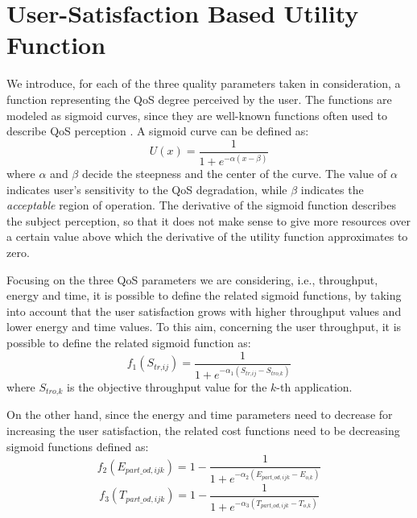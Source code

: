 \documentclass[twoside,openright]{report}
\begin{document}
\section{User-Satisfaction Based Utility Function} 
\label{sec:utility}
We introduce, for each of the three quality parameters taken in consideration, a function representing the \gls{QoS} degree perceived by the user. The functions are modeled as sigmoid curves, since they are well-known functions often used to describe \gls{QoS} perception \cite{Lohier,Badia,User-satisfaction}. A sigmoid curve can be defined as:
\begin{equation}
U(x)=\frac{1}{1+e^{-\alpha (x-\beta)}}
\label{eq:sigmoid}
\end{equation}
where $\alpha$ and $\beta$ decide the steepness and the center of the curve. The value of $\alpha$ indicates user's sensitivity to the  \gls{QoS} degradation, while $\beta$ indicates the \emph{acceptable} region of operation. The derivative of the sigmoid function describes the subject perception, so that it does not make sense to give more resources over a certain value above which the derivative of the utility function approximates to zero.

Focusing on the three \gls{QoS} parameters we are considering, i.e., throughput, energy and time, it is possible to define the related sigmoid functions, by taking into account that the user satisfaction grows with higher throughput values and lower energy and time values. To this aim, concerning the user throughput, it is possible to define the related sigmoid function as:
 \begin{equation}
	\label{eq:s}
	f_1(S_{\textit{tr},\textit{ij}}) =  \frac{1}{1+e^{-\alpha_1 (S_{\textit{tr},\textit{ij}}-S_{\textit{tro,k}})}}
	\end{equation}  
	where $S_{\textit{tro,k}}$ is the objective throughput value for the $k$-th application.
	
On the other hand, since the energy and time parameters need to decrease for increasing the user satisfaction, the related cost functions need to be decreasing sigmoid functions defined as: 
 \begin{equation}
	\label{eq:e}
	f_2(E_{\textit{part}\_\textit{od},\textit{ijk}}) =  1 - \frac{1}{1+e^{-\alpha_2 (E_{\textit{part}\_\textit{od},\textit{ijk}}-E_\textit{o,k})}}
	\end{equation}  
 \begin{equation}
	\label{t}
	f_3(T_{\textit{part}\_\textit{od},\textit{ijk}}) =  1 - \frac{1}{1+e^{-\alpha_3 (T_{\textit{part}\_\textit{od},\textit{ijk}}-T_\textit{o,k})}}
	\end{equation}  
\end{document}
